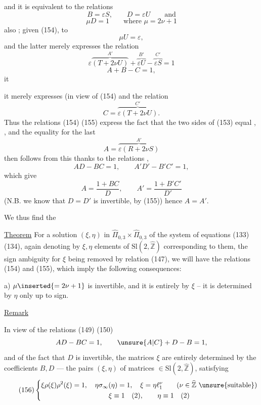 
and it is equivalent to the relations
\[
\tag{154}
B=\varepsilon S,\qquad D=\varepsilon U\qquad\text{and}
\]
\[
\tag{155}
\mu D=1\qquad\text{where }\mu=2\nu+1
\]
 also ; given (154), to
\[
\tag{155bis}
\mu U=\varepsilon,
\]
and the latter merely expresses  the relation
\[
\varepsilon\overbrace{(T+2\nu U)}^{A'}
+\overbrace{\varepsilon U}^{B'}-\overbrace{\varepsilon S}^{C'}=1
\]
\[
A+B-C=1,
\]
it


it merely expresses (in view of (154) and  the relation
\[
C=\overbrace{\varepsilon(T+2\nu U)}^{C'}.
\]
Thus the relations (154) (155) express the fact that the two sides of (153)   equal  , , and the equality for the last
\[
A=\overbrace{\varepsilon(R+2\nu S)}^{A'}
\]
then follows from this thanks to the relations , 
\[
AD-BC=1,\qquad A'D'-B'C'=1,
\]
which give
\[
A=\frac{1+BC}{D},\qquad A'=\frac{1+B'C'}{D'}
\]
(N.B. we know that $D=D'$ is invertible, by (155)) hence $A=A'$.

We thus find the

\uline{Theorem} For a solution $(\xi,\eta)$ in $\widehat{\Pi}_{0,3}\times\widehat{\Pi}_{0,3}$ of the system of equations (133) (134), again denoting by $\xi,\eta$ elements of $\mathrm{Sl}(2,\widehat{\mathbb Z})$ corresponding to them, the sign ambiguity for $\xi$ being removed by relation (147), we will have the relations (154) and (155), which imply the following consequences:

a) $\mu\inserted{=2\nu+1}$ is invertible, and it is entirely  by $\xi$ -- it is determined by $\eta$ only up to sign.


\uline{Remark}\par\nobreak
In view of the relations (149) (150)
\[
AD-BC=1,\qquad \unsure{A|C}+D-B=1,
\]
and of the fact that $D$ is invertible, the matrices $\xi$ are entirely determined by the coefficients $B,D$ --- the pairs $(\xi,\eta)$ of matrices $\in\mathrm{Sl}(2,\widehat{\mathbb Z})$, satisfying
\[
\tag{156}
\left\{\begin{gathered}
\xi\rho(\xi)\rho^2(\xi)=1,\quad
\eta\sigma_\infty(\eta)=1,\quad
\xi=\eta\ell_1^\nu
\qquad(\nu\in\widehat{\mathbb Z}\ \text{\unsure{suitable}})\\
\xi\equiv1\quad(2),\qquad\eta\equiv1\quad(2)
\end{gathered}\right.
\]

